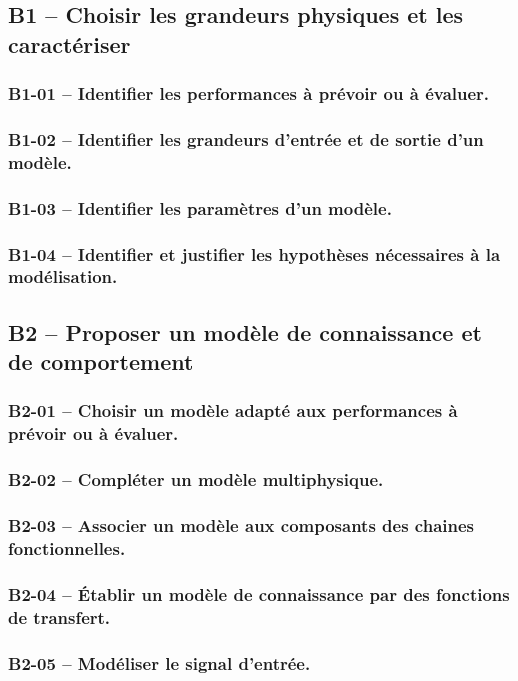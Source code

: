 \subsection{B1 -- Choisir les grandeurs physiques et les caractériser}  
\subsubsection*{B1-01 -- Identifier les performances à prévoir ou à évaluer.}  
\subsubsection*{B1-02 -- Identifier les grandeurs d'entrée et de sortie d’un modèle.}  
\subsubsection*{B1-03 -- Identifier les paramètres d’un modèle.}  
\subsubsection*{B1-04 -- Identifier et justifier les hypothèses nécessaires à la modélisation.}  
\subsection{B2 -- Proposer un modèle de connaissance et de comportement}  
\subsubsection*{B2-01 -- Choisir un modèle adapté aux performances à prévoir ou à évaluer.}  
\subsubsection*{B2-02 -- Compléter un modèle multiphysique.}  
\subsubsection*{B2-03 -- Associer un modèle aux composants des chaines fonctionnelles.}  
\subsubsection*{B2-04 -- Établir un modèle de connaissance par des fonctions de transfert.}  
\subsubsection*{B2-05 -- Modéliser le signal d'entrée.}  
